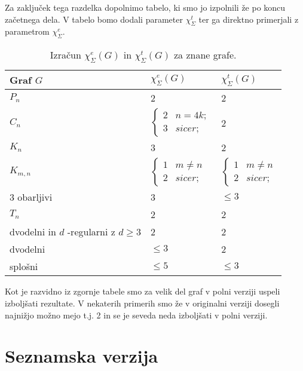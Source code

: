 \documentclass[12pt,a4paper,twoside]{article}
\theoremstyle{definition} %
\theoremstyle{plain} %
\newcommand{\ec}{\chi_{\Sigma}^e}
\newcommand{\ect}{\chi_{\Sigma}^t}
\numberwithin{equation}{section}  %
\begin{document}
Za zaključek tega razdelka dopolnimo tabelo, ki smo jo izpolnili že po koncu začetnega dela. V tabelo bomo dodali parameter $\ect$ ter ga direktno primerjali z parametrom $\ec$.
\begin{table}[H]

\caption{\label{tab:tab2} Izračun $\ec(G)$ in $\ect(G)$ za znane grafe. }
\centering
\begin{tabular}{|l|l|l|}
\hline
 Graf $G$ & $\ec(G)$ & $\ect(G) $ \\ \hline
 $P_n$ & 2 & 2 \\ \hline
 $C_n$ & $\begin{cases}
	2 & n = 4k;\\ 
	3 & sicer;
	\end{cases}$ & 2 \\ \hline
 $K_n$& 3 & 2 \\ \hline
 $K_{m,n}$& $\begin{cases}
	1 & m \neq n\\ 
	2 & sicer;
	\end{cases}$ &$\begin{cases}
	1 & m \neq n\\ 
	2 & sicer;
	\end{cases}$ \\ \hline
 3 obarljivi& 3 & $\le 3$ \\ \hline
$T_n$ & 2 & 2\\ \hline
dvodelni in $d$ -regularni z $d \ge 3 $ & 2  & 2\\ \hline
dvodelni   & $\le 3$  & 2\\ \hline
splošni   & $\le 5$  &$ \le 3$\\ \hline
\end{tabular}
\end{table}
Kot je razvidno iz zgornje tabele smo za velik del graf v polni verziji uspeli izboljšati rezultate. V nekaterih primerih smo že v originalni verziji dosegli najnižjo možno mejo t.j. 2 in se je seveda neda izboljšati v polni verziji.


\section{Seznamska verzija} 
\end{document}
